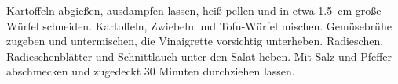 \begin{recipeDP}
{        \step Kartoffeln abgießen, ausdampfen lassen, heiß pellen und in etwa \SI{1,5}{\cm} große Würfel schneiden. Kartoffeln, Zwiebeln und Tofu-Würfel mischen. Gemüsebrühe zugeben und untermischen, die Vinaigrette vorsichtig unterheben. Radieschen, Radieschenblätter und Schnittlauch unter den Salat heben. Mit Salz und Pfeffer abschmecken und zugedeckt 30 Minuten durchziehen lassen.
    }


\end{recipeDP}
